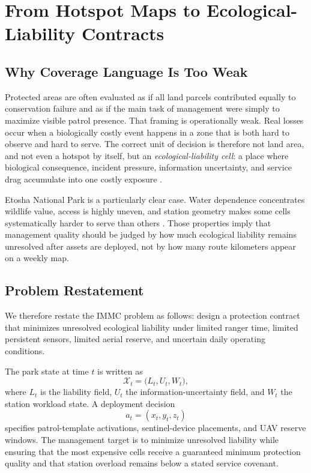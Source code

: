 \section{From Hotspot Maps to Ecological-Liability Contracts}
\subsection{Why Coverage Language Is Too Weak}
Protected areas are often evaluated as if all land parcels contributed equally to conservation failure and as if the main task of management were simply to maximize visible patrol presence. That framing is operationally weak. Real losses occur when a biologically costly event happens in a zone that is both hard to observe and hard to serve. The correct unit of decision is therefore not land area, and not even a hotspot by itself, but an \emph{ecological-liability cell}: a place where biological consequence, incident pressure, information uncertainty, and service drag accumulate into one costly exposure \citep{watson2014,geldmann2013,coad2019,jones2018}.

Etosha National Park is a particularly clear case. Water dependence concentrates wildlife value, access is highly uneven, and station geometry makes some cells systematically harder to serve than others \citep{etoshaOfficial,etoshaEcology}. Those properties imply that management quality should be judged by how much ecological liability remains unresolved after assets are deployed, not by how many route kilometers appear on a weekly map.

\subsection{Problem Restatement}
We therefore restate the IMMC problem as follows: design a protection contract that minimizes unresolved ecological liability under limited ranger time, limited persistent sensors, limited aerial reserve, and uncertain daily operating conditions.

The park state at time \(t\) is written as
\[
\mathcal{X}_t = \bigl(L_t,U_t,W_t\bigr),
\]
where \(L_t\) is the liability field, \(U_t\) the information-uncertainty field, and \(W_t\) the station workload state. A deployment decision
\[
a_t=(x_t,y_t,z_t)
\]
specifies patrol-template activations, sentinel-device placements, and UAV reserve windows. The management target is to minimize unresolved liability while ensuring that the most expensive cells receive a guaranteed minimum protection quality and that station overload remains below a stated service covenant.

